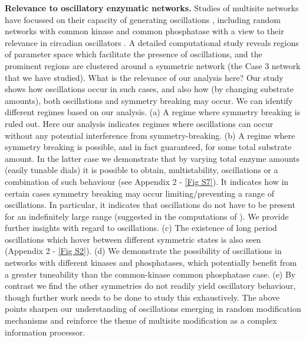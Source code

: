 \documentclass[9pt,lineno]{elife}
\begin{document}
{\bf Relevance to oscillatory enzymatic networks.} Studies of multisite networks have focussed on their capacity of generating oscillations \cite{Rust2007,VanZon2007}, including random networks with common kinase and common phosphatase with a view to their relevance in circadian oscillators \cite{Jolley2012}. 
A detailed computational study \cite{Jolley2012} reveals regions of parameter space which facilitate the presence of oscillations, and the prominent regions are clustered around a symmetric network (the Case 3 network that we have studied). What is the relevance of our analysis here?
Our study shows how oscillations occur in such cases, and also how (by changing substrate amounts), both oscillations and symmetry breaking may occur. 
We can identify different regimes based on our analysis.
(a) A regime where symmetry breaking is ruled out. 
Here our analysis indicates regimes where oscillations can occur without any potential interference from symmetry-breaking. 
(b) A regime where symmetry breaking is possible, and in fact guaranteed, for some total substrate amount. In the latter case we demonstrate that by varying total enzyme amounts (easily tunable dials) it is possible to obtain, multistability, oscillations or a combination of such behaviour (see Appendix 2 - \cref{Fig S7}). 
It indicates how in certain cases symmetry breaking may occur limiting/preventing a range of oscillations. 
In particular, it indicates that oscillations do not have to be present for an indefinitely large range (suggested in the computations of \cite{Jolley2012}).
We provide further insights with regard to oscillations. 
(c) The existence of long period oscillations which hover between different symmetric states is also seen (Appendix 2 - \cref{Fig S2}). 
(d) We demonstrate the possibility of oscillations in networks with different kinases and phosphatases, which potentially benefit from a greater tuneability than the common-kinase common phosphatase case. 
(e) By contrast we find the other symmetries do not readily yield oscillatory behaviour, though further work needs to be done to study this exhaustively. The above points sharpen our understanding of oscillations emerging in random modification mechanisms and reinforce the theme of multisite modification as a complex information processor. 
\end{document}
